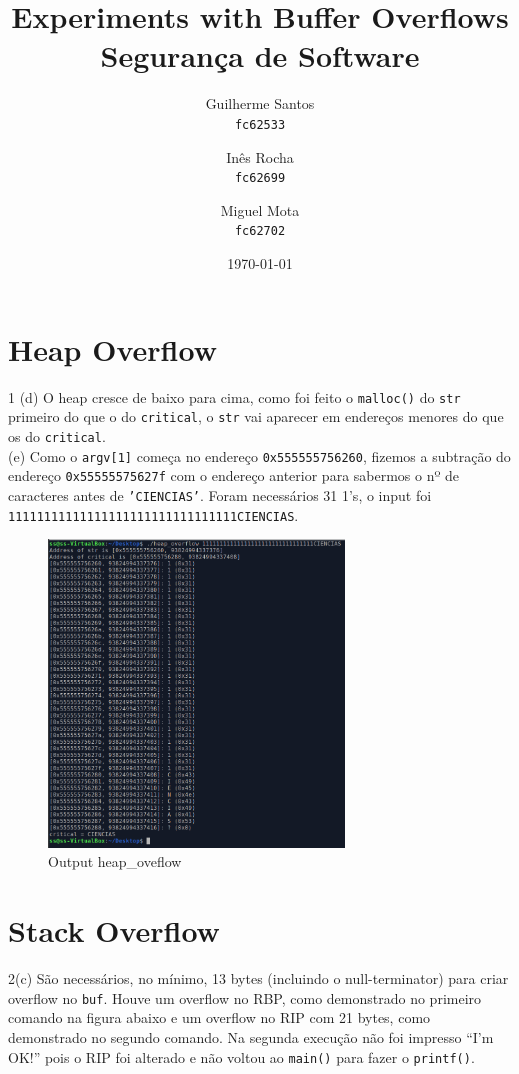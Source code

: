 \documentclass[11pt]{report}
\title{Experiments with Buffer Overflows \\ 
    \textbf{Segurança de Software}}
\author{
Guilherme Santos    \\
\texttt{fc62533}  \and
Inês Rocha       \\
\texttt{fc62699}  \and
Miguel Mota   \\ 
\texttt{fc62702}
}
\date{\today}
\begin{document}
\maketitle


\section*{Heap Overflow}

1 (d) O heap cresce de baixo para cima, como foi feito o \texttt{malloc()} do \texttt{str} 
primeiro do que o do \texttt{critical}, o \texttt{str} vai aparecer em endereços menores do que os do \texttt{critical}. \\

 (e) Como o \texttt{argv[1]} começa no endereço \texttt{0x555555756260}, fizemos a subtração do endereço 
\texttt{0x55555575627f} com o endereço anterior para sabermos o nº de caracteres antes de \texttt{'CIENCIAS'}.
Foram necessários 31 1's, o input foi \texttt{11111111111111111111111111111111CIENCIAS}.

\vspace{20pt}
\begin{figure}[h]
    \centering
    \includegraphics[width=0.7\textwidth]{ciencias.png}
    \caption{Output heap\_oveflow}
  \end{figure}

\pagebreak

\section*{Stack Overflow}

2(c) São necessários, no mínimo, 13 bytes (incluindo o null-terminator) para criar overflow no \texttt{buf}. Houve um overflow no RBP, 
como demonstrado no primeiro comando na figura abaixo e um overflow no RIP com 21 bytes, 
como demonstrado no segundo comando. 
Na segunda execução não foi impresso “I’m OK!” pois o RIP foi alterado e não voltou ao \texttt{main()} para fazer o \texttt{printf()}.
\end{document}
